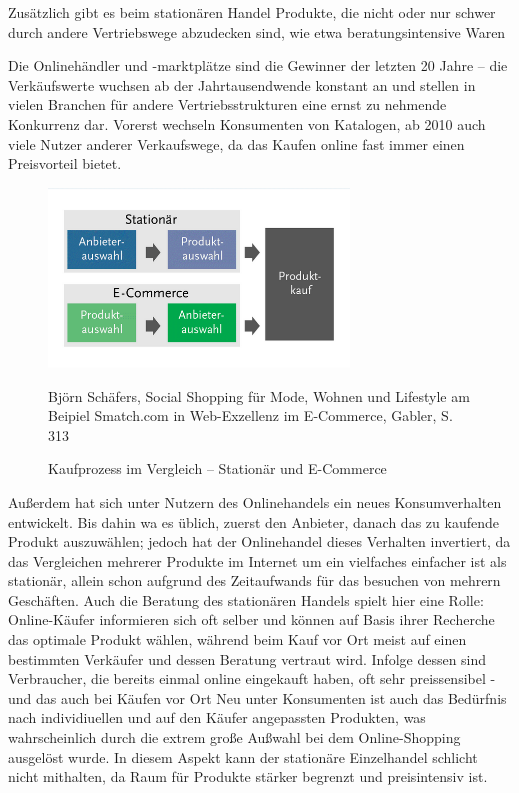 Zusätzlich gibt es beim stationären Handel Produkte, die nicht oder nur schwer durch andere Vertriebswege abzudecken sind, wie etwa beratungsintensive Waren



Die Onlinehändler und -marktplätze sind die Gewinner der letzten 20 Jahre – die Verkäufswerte wuchsen ab der Jahrtausendwende konstant an und stellen in vielen Branchen für andere Vertriebsstrukturen eine ernst zu nehmende Konkurrenz dar\cite{wolf}. Vorerst wechseln Konsumenten von Katalogen, ab 2010 auch viele Nutzer anderer Verkaufswege, da das Kaufen online fast immer einen Preisvorteil bietet\cite[S. 31]{Graf}.
\begin{figure}[h]
    \begin{center}
        \includegraphics[width=8cm]{media/Fabian-konsumwandel.png}
        \caption{Kaufprozess im Vergleich – Stationär und E-Commerce}
        \label{konsumwandel}
        \bildquelle Björn Schäfers, Social Shopping für Mode, Wohnen und Lifestyle am Beipiel Smatch.com in Web-Exzellenz im E-Commerce, Gabler, S. 313 %
    \end{center}
\end{figure} 
Außerdem hat sich unter Nutzern des Onlinehandels ein neues Konsumverhalten entwickelt. Bis dahin wa es üblich, zuerst den Anbieter, danach das zu kaufende Produkt auszuwählen; jedoch hat der Onlinehandel dieses Verhalten invertiert, da das Vergleichen mehrerer Produkte im Internet um ein vielfaches einfacher ist als stationär, allein schon aufgrund des Zeitaufwands für das besuchen von mehrern Geschäften\cite[S 22f]{Graf}. Auch die Beratung des stationären Handels spielt hier eine Rolle: Online-Käufer informieren sich oft selber und können auf Basis ihrer Recherche das optimale Produkt wählen, während beim Kauf vor Ort meist auf einen bestimmten Verkäufer und dessen Beratung vertraut wird\cite[S. 15f]{evilcom}. Infolge dessen sind Verbraucher, die bereits einmal online eingekauft haben, oft sehr preissensibel - und das auch bei Käufen vor Ort\cite[S. 60]{Nitt}
Neu unter Konsumenten ist auch das Bedürfnis nach individiuellen und auf den Käufer angepassten Produkten\cite[S. 43]{Nitt}, was wahrscheinlich durch die extrem große Außwahl bei dem Online-Shopping ausgelöst wurde. In diesem Aspekt kann der stationäre Einzelhandel schlicht nicht mithalten, da Raum für Produkte stärker begrenzt und preisintensiv ist. 

